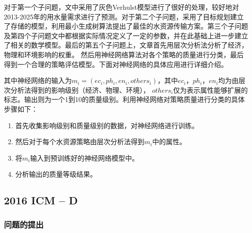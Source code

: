 \documentclass[bwprint]{cumcmthesis}
\begin{document}
对于第一个子问题，文中采用了灰色Verhulst模型进行了很好的处理，较好地对2013-2025年的用水量需求进行了预测。对于第二个子问题，采用了目标规划建立了存储的模型，利用最小生成树算法提出了最佳的水资源传输方案。第三个子问题及第四个子问题文中都根据实际情况定义了一定的参数，并在此基础上进一步建立了相关的数学模型。最后的第五个子问题上，文章首先用层次分析法分析了经济，物理和环境影响的权重。 然后用神经网络算法对各个策略的质量进行分类，最后得到一个合理的策略评估模型。下面对神经网络的具体应用进行详细介绍。

其中神经网络的输入为$m_i=(ec_i,ph_i,en_i,others_i)$，其中$ec_i$，$ph_i$，$en_i$均为由层次分析法得到的影响级别（经济、物理、环境），
$others_i$仅为表示属性能够扩展的标志。输出则为一个1到10的质量级别。利用神经网络对策略质量进行分类的具体步骤如下：
\begin{enumerate}
\item 首先收集影响级别和质量级别的数据，对神经网络进行训练。
\item 然后对于每个水资源策略由层次分析法得到$m_i$中的属性。
\item 将$m_i$输入到预训练好的神经网络模型中。
\item 分析输出的质量等级结果。
\end{enumerate}

\subsection{2016 ICM -- D}

\subsubsection{问题的提出}
\end{document}
